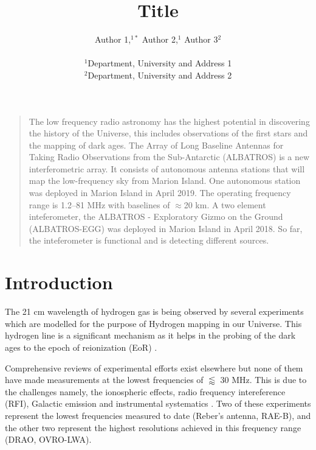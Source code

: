 \documentclass[12pt]{article}
\title{Title}
\author
{Author 1,$^{1\ast}$ Author 2,$^{1}$ Author 3$^{2}$\\
\\
\normalsize{$^{1}$Department, University and Address 1}\\
\normalsize{$^{2}$Department, University and Address 2}\\
}
\newenvironment{sciabstract}{%
\begin{quote} }
{\end{quote}}
\begin{document}
 


\baselineskip24pt


\maketitle 

\begin{sciabstract}
    The low frequency radio astronomy has the highest potential in discovering the history of the Universe, this includes observations of the first stars and the mapping of dark ages. The Array of Long Baseline Antennas for Taking Radio Observations from the Sub-Antarctic (ALBATROS) is a new interferometric array. It consists of autonomous antenna stations that will map the low-frequency sky from Marion Island. One autonomous station was deployed in Marion Island in April 2019. The operating frequency range is 1.2–81 MHz with baselines of $\approx$20 km. A two element inteferometer, the ALBATROS - Exploratory Gizmo on the Ground (ALBATROS-EGG) was deployed in Marion Island in April 2018. So far, the inteferometer is functional and is detecting different sources. \\
\end{sciabstract}


\section*{Introduction}
The 21 cm wavelength of hydrogen gas is being observed by several experiments which are modelled for the purpose of Hydrogen mapping in our Universe. This hydrogen line is a significant mechanism as it helps in the probing of the dark ages to the epoch of reionization (EoR)  \citep{2013PhRvD..87d3002L,2014ApJ...782...66P}.

Comprehensive reviews of experimental efforts exist elsewhere but none of them have made measurements at the lowest frequencies of $\lessapprox$ 30 MHz. This is due to the challenges namely, the ionospheric effects, radio frequency intereference (RFI), Galactic emission and instrumental systematics \citep{2018arXiv180609531P}. Two of these experiments represent the lowest frequencies measured to date (Reber’s antenna, RAE-B), and the other two represent the highest resolutions achieved in this frequency range (DRAO, OVRO-LWA).\\
\end{document}
